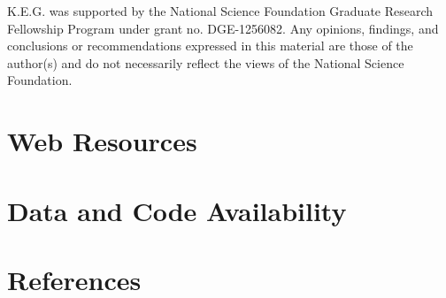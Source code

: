 \documentclass[12pt]{article}
\begin{document}

K.E.G. was supported by the National Science Foundation Graduate Research Fellowship Program under grant no. DGE-1256082. Any opinions, findings, and conclusions or recommendations expressed in this material are those of the author(s) and do not necessarily reflect the views of the National Science Foundation.

\section{Web Resources}


\section{Data and Code Availability}



\section{References}

\end{document}
